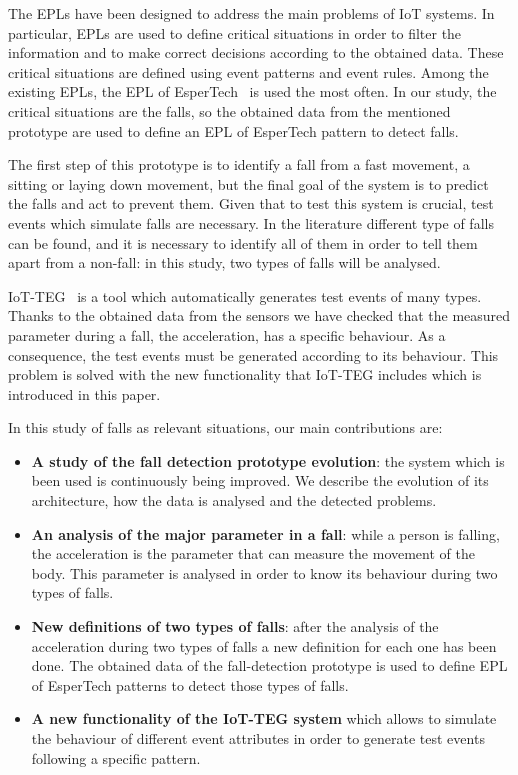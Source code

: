 \documentclass[review]{elsarticle}
\begin{document}
The EPLs have been designed to address the main problems of 
IoT systems. In particular, EPLs are used to define critical situations in order to filter the 
information and to make correct decisions according to the obtained data. These critical 
situations are defined using event patterns and event rules. Among the existing EPLs, the 
EPL of EsperTech~\cite{Esper:2016} is used the most often. In our study, the critical situations are the falls,
so the obtained data from the mentioned prototype are used to define an EPL of EsperTech 
pattern to detect falls.

The first step of this prototype is to identify a fall from a fast movement, a sitting or laying 
down movement, but the final goal of the system is to predict the falls and act to prevent 
them. Given that to test this system is crucial, test events which simulate falls are necessary. In 
the literature different type of falls can be found, and it is necessary to identify all of them in 
order to tell them apart from a non-fall: in this study, two types of falls will be analysed. 

IoT-TEG~\cite{TesisGutierrez2017,Gutierrez2017} is a tool which automatically generates test events 
of many types. Thanks to the obtained data from the sensors we have checked that the measured 
parameter during a fall, the acceleration, has a specific behaviour. As a consequence, the test events 
must be generated according to its behaviour. This problem is solved with the new functionality that 
IoT-TEG includes which is introduced in this paper. %

In this study of falls as relevant situations, our main contributions are:

\begin{itemize}
\item \textbf{A study of the fall detection prototype evolution}: the system which is been used is
 continuously being improved. We describe the evolution of its architecture, how the data is analysed and 
 the detected problems.
 \item \textbf{An analysis of the major parameter in a fall}: while a person is falling, the acceleration 
 is the parameter that can measure the movement of the body. This parameter is analysed in order to know 
 its behaviour during two types of falls.
 \item \textbf{New definitions of two types of falls}: after the analysis of the acceleration during two 
 types of falls a new definition for each one has been done. The obtained data of the fall-detection 
 prototype is used to define EPL of EsperTech patterns to detect those types of falls. 
 \item \textbf{A new functionality of the IoT-TEG system} which allows to simulate the behaviour of 
 different event attributes in order to generate test events following a specific pattern. 
\end{itemize}
\end{document}
